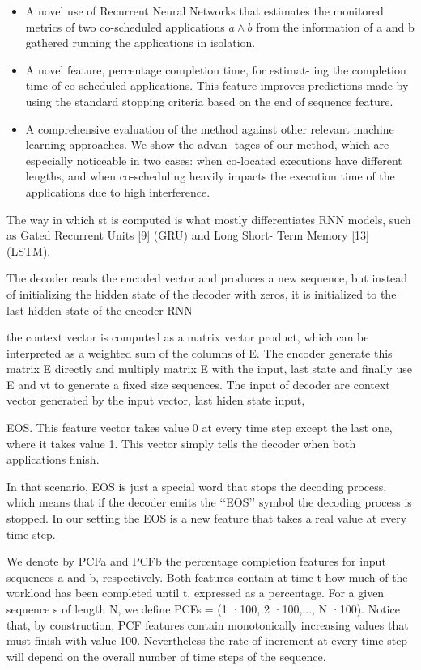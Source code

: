 \documentclass[UTF8]{article}
\begin{document}
\begin{itemize}
	\item  A novel use of Recurrent Neural Networks that estimates the monitored metrics of two co-scheduled applications $a \wedge b$ from the information of a and b gathered running the applications in isolation.
	\item A novel feature, percentage completion time, for estimat- ing the completion time of co-scheduled applications. This feature improves predictions made by using the standard stopping criteria based on the end of sequence feature.
	\item A comprehensive evaluation of the method against other relevant machine learning approaches. We show the advan- tages of our method, which are especially noticeable in two cases: when co-located executions have different lengths, and when co-scheduling heavily impacts the execution time of the applications due to high interference.
\end{itemize}

The way in which st is computed is what mostly differentiates RNN models, such as Gated Recurrent Units [9] (GRU) and Long Short- Term Memory [13] (LSTM).

The decoder reads the encoded vector and produces a new sequence, but instead of initializing the hidden state of the decoder with zeros, it is initialized to the last hidden state of the encoder RNN

the context vector is computed as a matrix vector product, which can be interpreted as a weighted sum of the columns of E. The encoder generate this matrix E directly and multiply matrix E with the input, last state and finally use E and vt to generate a fixed size sequences. The input of decoder are context vector generated by the input vector, last hiden state input, 

EOS. This feature vector takes value 0 at every time step except the last one, where it takes value 1. This vector simply tells the decoder when both applications finish.

In that scenario, EOS is just a special word that stops the decoding process, which means that if the decoder emits the ‘‘EOS’’ symbol the decoding process is stopped. In our setting the EOS is a new feature that takes a real value at every time step.

We denote by PCFa and PCFb the percentage completion features for input sequences a and b, respectively. Both features contain at time t how much of the workload has been completed until t, expressed as a percentage. For a given sequence s of length N, we define PCFs = (1 ·100, 2 ·100,..., N ·100). Notice that, by construction, PCF features contain monotonically increasing values that must finish with value 100. Nevertheless the rate of increment at every time step will depend on the overall number of time steps of the sequence.
\end{document}
